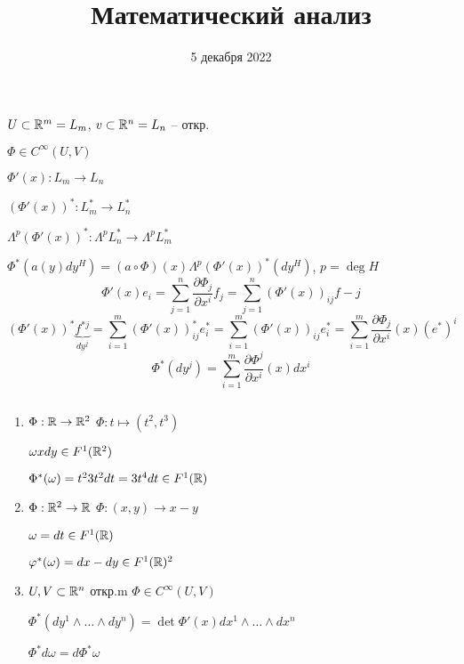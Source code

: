 


    \title{Математический анализ}
    \date{5 декабря 2022}
    \maketitle{}

    \pagebreak
    
    \par $U \subset \mathbb{R}^m = L_m$, $v \subset \mathbb{R}^n = L_n$ -- откр.
    \par $\Phi \in C^\infty (U, V)$
    \par $\Phi'(x) : L_m \rightarrow L_n$
    \par $(\Phi'(x))^* : L_m^* \rightarrow L_n^*$
    \par $\Lambda^p(\Phi'(x))^* : \Lambda^pL_n^* \rightarrow \Lambda^pL_m^*$
    \par $\Phi^*(a(y)dy^H) = (a \circ \Phi)(x) \Lambda^p(\Phi'(x))^*(dy^H)$, $p = \deg H$
    \[
        \Phi'(x)e_i = \sum_{j=1}^n \frac{\partial \Phi_j}{\partial x^i} f_j = \sum_{j=1}^n (\Phi'(x))_{ij} f-j  
    \]
    \[
        (\Phi'(x))^* \underbrace{f^{*j}}_{d y^j} = \sum_{i=1}^m (\Phi'(x))^*_{ij} e_i^* = \sum_{i=1}^m (\Phi'(x))_{ij} e_i^* = \sum_{i=1}^m \frac{\partial \Phi_j}{\partial x^i}(x)(e^*)^i
    \]
    \[
        \Phi^*(d y^j) = \sum_{i=1}^m  \frac{\partial \Phi^j}{\partial x^i}(x) dx^i    
    \]

    \begin{example*} $ $
        \begin{enumerate}
            \item $\Phi : \mathbb{R} \rightarrow \mathbb{R}^2$ \quad $\Phi : t \mapsto (t^2, t^3)$
                \par $\omega x dy \in F^1(\mathbb{R}^2)$
                \par $\Phi^*(\omega) = t^2 3t^2 dt = 3t^4 dt \in F^1(\mathbb{R})$
            \item $\Phi : \mathbb{R}^2 \rightarrow \mathbb{R}$ \quad $\Phi : (x, y) \rightarrow x - y$
                \par $\omega = dt \in F^1(\mathbb{R})$
                \par $\varphi^*(\omega) = dx - dy \in F^1(\mathbb{R})^2$
            \item $U, V \subset \mathbb{R}^n$ откр.m $\Phi \in C^\infty (U, V)$
                \par $\Phi^*(dy^1 \wedge \dots \wedge dy^n) = \det \Phi' (x) dx^1 \wedge \dots \wedge dx^n$
                \par $\Phi^* d\omega = d \Phi^* \omega$
        \end{enumerate}
    \end{example*}

